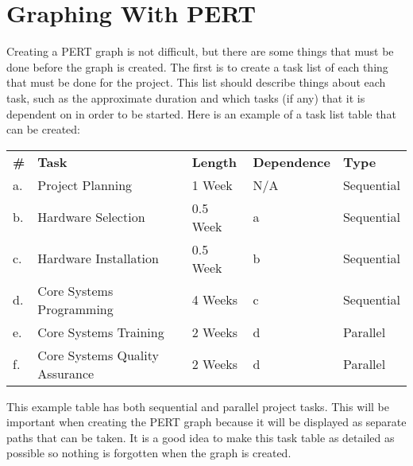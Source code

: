 \documentclass[12pt]{article}
\begin{document}
\section{Graphing With PERT}
Creating a PERT graph is not difficult, but there are some things that must be done before the graph is created.
The first is to create a task list of each thing that must be done for the project.
This list should describe things about each task, such as the approximate duration and which tasks (if any) that it is dependent on in order to be started.  Here is an example of a task list table that can be created:
\newline\newline
{\footnotesize
\begin{tabular}{|lllll|}
  \textbf{\#} & \textbf{Task} & \textbf{Length} & \textbf{Dependence} & \textbf{Type} \\
  a. & Project Planning & 1 Week & N/A & Sequential \\
  b. & Hardware Selection & 0.5 Week & a & Sequential \\
  c. & Hardware Installation & 0.5 Week & b & Sequential \\
  d. & Core Systems Programming & 4 Weeks & c & Sequential \\
  e. & Core Systems Training & 2 Weeks & d & Parallel \\
  f. & Core Systems Quality Assurance & 2 Weeks & d & Parallel
\end{tabular}}
\newline

This example table has both sequential and parallel project tasks.
This will be important when creating the PERT graph because it will be displayed as separate paths that can be taken.  It is a good idea to make this task table as detailed as possible so nothing is forgotten when the graph is created.
\end{document}
